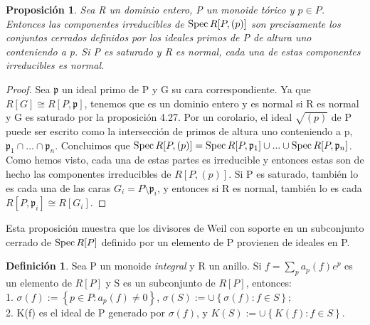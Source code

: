 \documentclass[12pt,spanish]{amsart}
\newcommand{\fk}[1]{\mathfrak{#1}}
\newcommand{\set}[1]{\left\{{#1}\right\}}
\def\Spec{\mathop{\mbox{\normalfont Spec}}\nolimits}
\newtheorem{prop}[Theorem]{Proposición}
\theoremstyle{definition}
\newtheorem{Def}[Theorem]{Definición}
\theoremstyle{remark}
\begin{document}
\begin{prop}
Sea R un dominio entero, P un monoide tórico y $p\in P$. Entonces las componentes irreducibles de $\Spec{R[P,(p)]}$ son precisamente los conjuntos cerrados definidos por los ideales primos de P de altura uno conteniendo a p. Si P es saturado y R es normal, cada una de estas componentes irreducibles es normal. 
\end{prop}

\begin{proof}
Sea $\fk{p}$ un ideal primo de P y G su cara correspondiente. Ya que $R[G] \cong R[P,\fk{p}]$, tenemos que es un dominio entero y es normal si R es normal y G es saturado por la proposición 4.27. Por un corolario, el ideal $\sqrt{(p)}$ de P puede ser escrito como la intersección de primos de altura uno conteniendo a p, $\fk{p}_{1} \cap ... \cap \fk{p}_{n}$. Concluimos que $\Spec{R[P,(p)]}= \Spec{R[P,\fk{p}_{1}]} \cup ... \cup \Spec{R[P,\fk{p}_{n}]}$. Como hemos visto, cada una de estas partes es irreducible y entonces estas son de hecho las componentes irreducibles de $R[P,(p)]$. Si P es saturado, también lo es cada una de las caras $G_{i}=P \setminus \fk{p}_{i}$, y entonces si R es normal, también lo es cada $R[P,\fk{p}_{i}] \cong R[G_{i}]$.  
\end{proof}

Esta proposición muestra que los divisores de Weil con soporte en un subconjunto cerrado de $\Spec{R[P]}$ definido por un elemento de P provienen de ideales en P. 


\begin{Def}
Sea P un monoide \textit{integral} y R un anillo. Si $f=\sum_{p} a_{p}(f)e^{p} $ es un elemento de $R[P]$ y S es un subconjunto de $R[P]$, entonces: \\
1. $\sigma(f) := \set{p\in P: a_{p}(f) \neq 0}$, $\sigma(S):= \cup \set{\sigma(f):f\in S};$ \\
2. K(f) es el ideal de P generado por $\sigma(f)$, y $K(S):=\cup \set{K(f):f\in S}.$
\end{Def}
\end{document}
